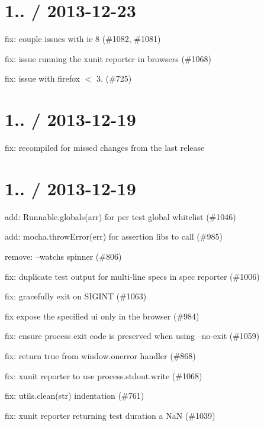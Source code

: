 \section*{1.. / 2013-\/12-\/23}


\begin{DoxyItemize}
\item fix\+: couple issues with ie 8 (\#1082, \#1081)
\item fix\+: issue running the xunit reporter in browsers (\#1068)
\item fix\+: issue with firefox $<$ 3. (\#725)
\end{DoxyItemize}

\section*{1.. / 2013-\/12-\/19}


\begin{DoxyItemize}
\item fix\+: recompiled for missed changes from the last release
\end{DoxyItemize}

\section*{1.. / 2013-\/12-\/19}


\begin{DoxyItemize}
\item add\+: Runnable.\+globals(arr) for per test global whitelist (\#1046)
\item add\+: mocha.\+throw\+Error(err) for assertion libs to call (\#985)
\item remove\+: --watch\textquotesingle{}s spinner (\#806)
\item fix\+: duplicate test output for multi-\/line specs in spec reporter (\#1006)
\item fix\+: gracefully exit on S\+I\+G\+I\+NT (\#1063)
\item fix expose the specified ui only in the browser (\#984)
\item fix\+: ensure process exit code is preserved when using --no-\/exit (\#1059)
\item fix\+: return true from window.\+onerror handler (\#868)
\item fix\+: xunit reporter to use process.\+stdout.\+write (\#1068)
\item fix\+: utils.\+clean(str) indentation (\#761)
\item fix\+: xunit reporter returning test duration a NaN (\#1039)
\end{DoxyItemize}


